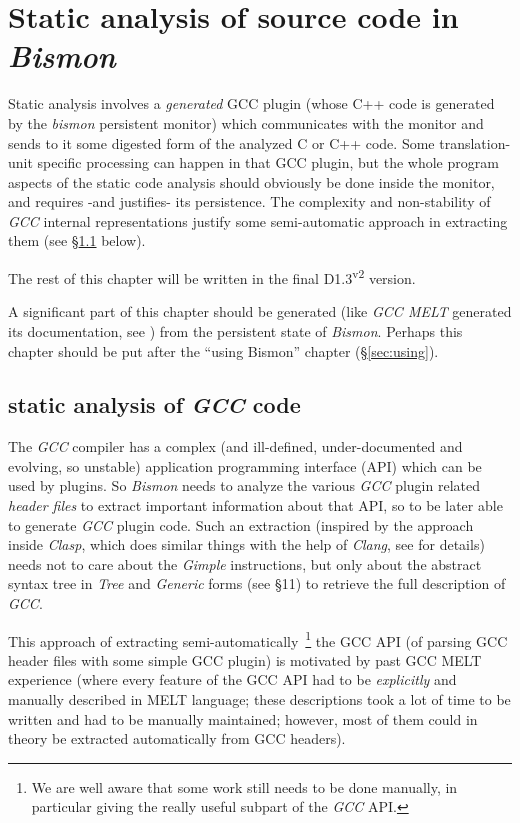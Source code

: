 \section{Static analysis of source code in \emph{Bismon}}
\label{sec:staticanalys}

Static analysis involves a \emph{generated} GCC plugin (whose C++ code
is generated by the \emph{bismon} persistent monitor) which
communicates with the monitor and sends to it some digested form of
the analyzed C or C++ code. Some translation-unit specific processing
can happen in that GCC plugin, but the whole program aspects of the
static code analysis should obviously be done inside the monitor, and
requires -and justifies- its persistence. The complexity and
non-stability of \emph{GCC} internal representations justify some
semi-automatic approach in extracting them (see \S\ref{subsec:analygcc}
below).

The rest of this chapter will be written in the final D1.3\textsuperscript{v2} version.

A significant part of this chapter should be generated (like \emph{GCC
  MELT} generated its documentation, see
\cite{Starynkevitch-GCCMELTweb}) from the persistent state of
\emph{Bismon}. Perhaps this chapter should be put after the ``using
Bismon'' chapter (\S\ref{sec:using}).

\subsection{static analysis of \emph{GCC} code}
\label{subsec:analygcc}

The \emph{GCC} compiler has a complex (and ill-defined,
under-documented and evolving, so unstable) application programming
interface (API) which can be used by plugins. So \emph{Bismon} needs
to analyze the various \emph{GCC} plugin related \emph{header files}
to extract important information about that API, so to be later able
to generate \emph{GCC} plugin code. Such an extraction (inspired by
the approach inside \emph{Clasp}, which does similar things with the
help of \emph{Clang}, see \cite{Schafmeister:2015:CLASP} for details)
needs not to care about the \emph{Gimple} instructions, but only about
the abstract syntax tree in \emph{Tree} and \emph{Generic} forms (see
\cite{gcc-internals} \S11) to retrieve the full description of
\emph{GCC}.

This approach of extracting semi-automatically~\footnote{We are well
  aware that some work still needs to be done manually, in particular
  giving the really useful subpart of the \emph{GCC} API.} the GCC API
(of parsing GCC header files with some simple GCC plugin) is motivated
by past GCC MELT experience (where every feature of the GCC API had to
be \emph{explicitly} and manually described in MELT language; these
descriptions took a lot of time to be written and had to be manually
maintained; however, most of them could in theory be extracted
automatically from GCC headers).

